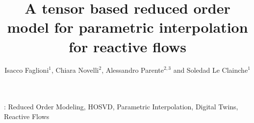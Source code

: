 \documentclass[12pt]{iopart}
\begin{document}
\title{A tensor based reduced order model for parametric interpolation for reactive flows}

\author{Isacco Faglioni$^{1}$, Chiara Novelli$^{2}$, Alessandro Parente$^{2,3}$ and Soledad Le Clainche$^{1}$}

\address{$^{1}$School of Aeronautical and Space Engineering, Universidad Polit\'ecnica de Madrid, Madrid, Spain}
\address{$^{2}$Aero-Thermo-Mechanics Department, Universit\'e Libre de Bruxelles, Brussels, Belgium}
\address{$^{3}$Brussels Institute for Thermal-fluid Systems and Clean Energy (BRITE), ULB and VUB, Belgium}


\begin{abstract}

\end{abstract}

\vspace{2pc}
: Reduced Order Modeling, HOSVD, Parametric Interpolation, Digital Twins, Reactive Flows

\maketitle












\end{document}
